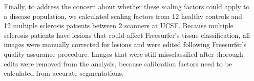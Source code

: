 Finally, to address the concern about whether these scaling factors could apply to a disease population, we calculated scaling factors from 12 healthy controls and 12 multiple sclerosis patients between 2 scanners at UCSF. Because multiple sclerosis patients have lesions that could affect Freesurfer's tissue classification, all images were manually corrected for lesions and were edited following Freesurfer's quality assurance procedure. Images that were still missclassified after thorough edits were removed from the analysis, because calibration factors need to be calculated from accurate segmentations.